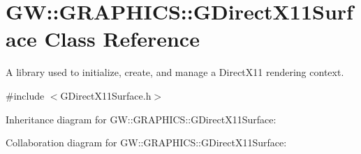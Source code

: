 \hypertarget{classGW_1_1GRAPHICS_1_1GDirectX11Surface}{}\section{GW\+:\+:G\+R\+A\+P\+H\+I\+CS\+:\+:G\+Direct\+X11\+Surface Class Reference}
\label{classGW_1_1GRAPHICS_1_1GDirectX11Surface}


A library used to initialize, create, and manage a Direct\+X11 rendering context.  




{\ttfamily \#include $<$G\+Direct\+X11\+Surface.\+h$>$}



Inheritance diagram for GW\+:\+:G\+R\+A\+P\+H\+I\+CS\+:\+:G\+Direct\+X11\+Surface\+:


Collaboration diagram for GW\+:\+:G\+R\+A\+P\+H\+I\+CS\+:\+:G\+Direct\+X11\+Surface\+:
